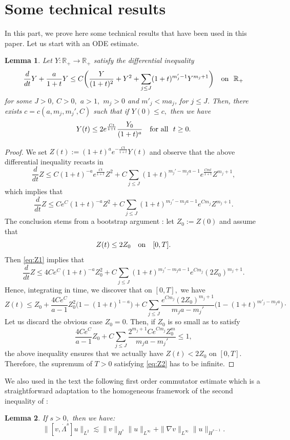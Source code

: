 \documentclass[11pt,twoside]{amsart}
\newtheorem{lem}{Lemma}[section]
\newcommand\R{\mathbb{R}}
\begin{document}
\section{Some technical results}\label{appendix}

 In this part, we prove here some technical results that have been used in this paper.  Let us start with an ODE estimate.


\begin{lem}\label{l:ODE} Let $Y:\R_+\to\R_+$ satisfy the differential inequality 
$$\frac d{dt}Y+\frac a{1+t}Y\leq C\biggl(\frac Y{(1+t)^2}+Y^2+\sum_{j\leq J}(1+t)^{m'_j-1}Y^{m_j+1}\biggr)\quad\hbox{on }\ \R_+$$
for some $J>0$, $C>0,$ $a>1,$ $m_j>0$ and $m'_j<ma_j$, for $j\leq J$. 
Then, there exists $c=c(a,m_j,m_j',C)$ such that if $Y(0)\leq c,$ then we have
$$
Y(t)\leq 2e^{\frac{Ct}{1+t}}\frac{Y_0}{(1+t)^a}\quad\hbox{for all }\ t\geq0.
$$
\end{lem}
\begin{proof}
We set $Z(t):=(1+t)^ae^{-\frac{Ct}{1+t}}Y(t)$ and observe that  the above differential inequality recasts in 
$$\frac d{dt} Z\leq C(1+t)^{-a}e^{\frac{Ct}{1+t}}Z^2
+C\sum_{j\leq J}(1+t)^{m_j'-m_ja-1}e^{\frac{Cmt}{1+t}}Z^{m_j+1},$$
which implies that
\begin{equation}\label{eq:Z1}\frac d{dt} Z\leq Ce^C(1+t)^{-a}Z^2+C\sum_{j\leq J}(1+t)^{m_j'-m_ja-1}e^{Cm_j}Z^{m_j+1}.\end{equation}
The conclusion stems from a  bootstrap argument : let $Z_0:=Z(0)$ and  assume that 
\begin{equation}\label{eq:Z2}
Z(t)\leq 2Z_0\quad\hbox{on}\quad [0,T].\end{equation}
 Then \eqref{eq:Z1} implies that
$$\frac d{dt} Z\leq 4Ce^C(1+t)^{-a}Z_0^2+C\sum_{j\leq J}(1+t)^{m_j'-m_ja-1}e^{Cm_j}(2Z_0)^{m_j+1}.$$
Hence, integrating in time, we discover that on $[0,T],$ we have
$$Z(t)\leq Z_0+\frac{4Ce^C}{a-1}Z_0^2\bigl(1-(1+t)^{1-a}\bigr)+C\sum_{j\leq J}\frac{e^{Cm_j}(2Z_0)^{m_j+1}}{m_ja-m_j'}\bigl(1-(1+t)^{m'_j-m_ja}\bigr)\cdotp$$
Let us discard the obvious case $Z_0=0.$ Then, if  $Z_0$ is so small as to satisfy 
$$\frac{4Ce^C}{a-1}Z_0+C\sum_{j\leq J}\frac{2^{m_j+1}Ce^{Cm_j} Z_0^m}{m_ja-m_j'}\leq 1,$$
the above inequality ensures that  we actually have $Z(t)<2Z_0$ on $[0,T]$. Therefore, the supremum of $T>0$ satisfying \eqref{eq:Z2} has to be infinite.
\end{proof}

We also used in the text the following first order  commutator estimate which
is a straightforward adaptation 
  to the homogeneous framework of the second inequality of
\cite[Lemma A.2]{BDD}:
\begin{lem}\label{l:com1} If $s>0,$ then we have:
$$\|[v,\dot\Lambda^s]u\|_{L^2}\lesssim
\|v\|_{\dot H^s}\|u\|_{L^\infty}+\|\nabla v\|_{L^\infty}\|u\|_{\dot H^{s-1}}.$$
\end{lem}
\end{document}
